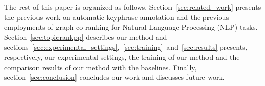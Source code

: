 
  The rest of this paper is organized as follows. Section~\ref{sec:related_work}
  presents the previous work on automatic keyphrase annotation and the previous
  employments of graph co-ranking for Natural Language Processing (NLP) tasks.
  Section~\ref{sec:topicrankpp} describes our method and
  sections~\ref{sec:experimental_settings},~\ref{sec:training}~and~\ref{sec:results}
  presents, respectively, our experimental settings, the training of our method
  and the comparison results of our method with the baselines. Finally,
  section~\ref{sec:conclusion} concludes our work and discusses future work.


